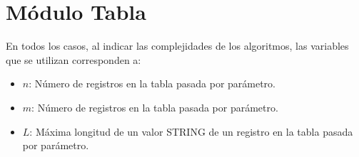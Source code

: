 \section{M\'odulo Tabla}

  En todos los casos, al indicar las complejidades de los algoritmos, las variables que se utilizan corresponden a:
  \vspace{-0.5em}\begin{itemize}
    \item $n$: N\'umero de registros en la tabla pasada por par\'ametro.
    \item $m$: N\'umero de registros en la tabla pasada por par\'ametro.
    \item $L$: M\'axima longitud de un valor STRING de un registro en la tabla pasada por par\'ametro.
  \end{itemize}


